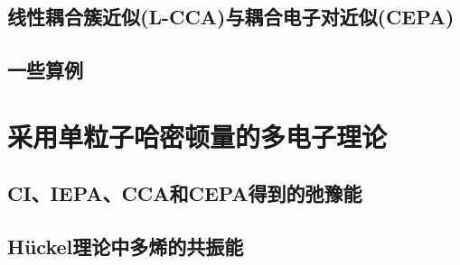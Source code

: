 \subsection{线性耦合簇近似(L-CCA)与耦合电子对近似(CEPA)}
\subsection{一些算例}

\section{采用单粒子哈密顿量的多电子理论}
\subsection{CI、IEPA、CCA和CEPA得到的弛豫能}
\subsection{H\"uckel理论中多烯的共振能}